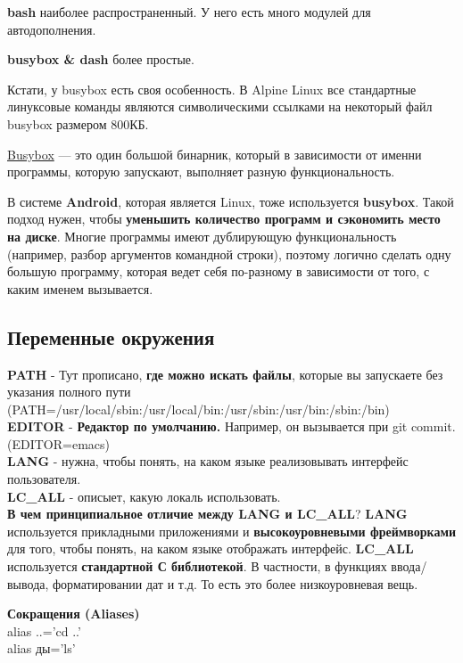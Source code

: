 \textbf{bash} наиболее распространенный. У него есть много модулей для автодополнения.

\textbf{busybox \& dash} более простые. 

Кстати, у busybox есть своя особенность. В Alpine Linux все стандартные линуксовые команды являются символическими ссылками на некоторый файл busybox размером 800КБ. 

\begin{Def}
	\underline{Busybox} --- это один большой бинарник, который в зависимости от именни программы, которую запускают, выполняет разную функциональность.
\end{Def}

В системе \textbf{Android}, которая является Linux, тоже используется \textbf{busybox}. Такой подход нужен, чтобы \textbf{уменьшить количество программ и сэкономить место на диске}. Многие программы имеют дублирующую функциональность (например, разбор аргументов командной строки), поэтому логично сделать одну большую программу, которая ведет себя по-разному в зависимости от того, с каким именем вызывается.

\subsection{Переменные окружения}

\textbf{PATH} - Тут прописано, \textbf{где можно искать файлы}, которые вы запускаете без указания полного пути (PATH=/usr/local/sbin:/usr/local/bin:/usr/sbin:/usr/bin:/sbin:/bin) \\
\textbf{EDITOR} - \textbf{Редактор по умолчанию.} Например, он вызывается при git commit. (EDITOR=emacs) \\
\textbf{LANG} - нужна, чтобы понять, на каком языке реализовывать интерфейс пользователя. \\
\textbf{LC\_ALL} - описыет, какую локаль использовать. \\

\textbf{В чем принципиальное отличие между LANG и LC\_ALL}? \textbf{LANG} используется прикладными приложениями и \textbf{высокоуровневыми фреймворками} для того, чтобы понять, на каком языке отображать интерфейс. \textbf{LC\_ALL} используется \textbf{стандартной С библиотекой}. В частности, в функциях ввода/вывода, форматировании дат и т.д. То есть это более низкоуровневая вещь.

\textbf{Сокращения (Aliases)} \\
alias ..='cd ..' \\
alias ды='ls'


